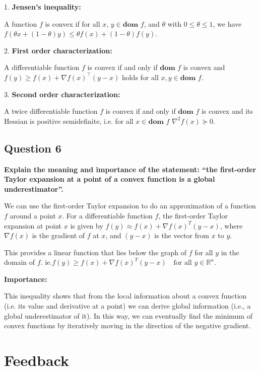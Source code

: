 1. \textbf{Jensen's inequality:} 

A function $f$ is convex if for all $x$, $y \in \textbf{dom } f$, and $\theta$ with $0 \le \theta \le  1$, we have $ f(\theta x + (1 - \theta)y) \le  \theta f(x) + (1 - \theta)f(y)$. 

2. \textbf{First order characterization:} 

A differentiable function $f$ is convex if and only if $\textbf{dom } f$ is convex and $f(y) \ge f(x) + \nabla f(x)^\top (y-x)$ holds for all $x,y \in \textbf{dom }f$. 

3. \textbf{Second order characterization:} 

A twice differentiable function $f$ is convex if and only if $\textbf{dom }f$ is convex and its Hessian is positive semidefinite, i.e. for all $x \in \textbf{dom }f$ $\nabla^2 f(x) \succcurlyeq 0$. 

\subsection*{Question 6}
\textbf{Explain the meaning and importance of the statement: “the ﬁrst-order Taylor expansion at a point of a convex function is a global underestimator”.}

We can use the first-order Taylor expansion to do an approximation of a function \( f \) around a point \( x \). For a differentiable function \( f \), the first-order Taylor expansion at point \( x \) is given by $f(y) \approx f(x) + \nabla f(x)^T (y - x) $, where \( \nabla f(x) \) is the gradient of \( f \) at \( x \), and \( (y - x) \) is the vector from \( x \) to \( y \).

This provides a linear function that lies below the graph of \( f \) for all \( y \) in the domain of \( f \). ie.$ f(y) \geq f(x) + \nabla f(x)^T (y - x) \quad \text{for all } y \in \mathbb{R}^n $. 

\textbf{Importance:} 

This inequality shows that from the local information about a convex function (i.e. its value and derivative at a point) we can derive global information (i.e., a global underestimator of it). In this way, we can eventually find the minimum of convex functions by iteratively moving in the direction of the negative gradient. 


\newpage

\section*{Feedback}

